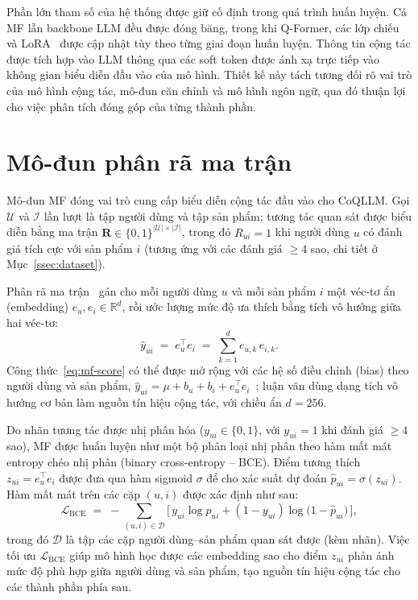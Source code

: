 Phần lớn tham số của hệ thống được giữ cố định trong quá trình huấn luyện. Cả MF lẫn backbone
LLM đều được đóng băng, trong khi Q-Former, các lớp chiếu và LoRA~\cite{lora2021} được cập nhật tùy theo từng giai đoạn huấn luyện.
Thông tin cộng tác được tích hợp vào LLM thông qua các soft token được ánh xạ trực tiếp vào không gian biểu diễn đầu vào của mô hình.
Thiết kế này tách tương đối rõ vai trò của mô hình cộng tác, mô-đun căn chỉnh và mô hình ngôn ngữ, qua đó thuận lợi cho
việc phân tích đóng góp của từng thành phần.

\section{Mô-đun phân rã ma trận}
\label{sec:mf}

Mô-đun MF đóng vai trò cung cấp biểu diễn cộng tác đầu vào cho CoQLLM. Gọi $\mathcal{U}$ và
$\mathcal{I}$ lần lượt là tập người dùng và tập sản phẩm; tương tác quan sát được biểu diễn
bằng ma trận $\mathbf{R} \in \{0,1\}^{|\mathcal{U}| \times |\mathcal{I}|}$, trong đó
$R_{ui}=1$ khi người dùng $u$ có đánh giá tích cực với sản phẩm $i$ (tương ứng với các đánh giá
$\ge 4$ sao, chi tiết ở Mục~\ref{ssec:dataset}).

Phân rã ma trận~\cite{mf2009} gán cho mỗi người dùng $u$ và mỗi sản phẩm $i$ một véc-tơ ẩn
(embedding) $e_u, e_i \in \mathbb{R}^{d}$, rồi ước lượng mức độ ưa thích bằng tích vô hướng
giữa hai véc-tơ:
\begin{equation}\label{eq:mf-score}
\hat{y}_{ui} \;=\; e_u^\top e_i \;=\; \sum_{k=1}^{d} e_{u,k}\, e_{i,k}.
\end{equation}
Công thức~\eqref{eq:mf-score} có thể được mở rộng với các hệ số điều chỉnh (bias) theo người
dùng và sản phẩm, $\hat{y}_{ui} = \mu + b_u + b_i + e_u^\top e_i$~\cite{mf2009}; luận văn dùng
dạng tích vô hướng cơ bản làm nguồn tín hiệu cộng tác, với chiều ẩn $d = 256$.

Do nhãn tương tác được nhị phân hóa ($y_{ui} \in \{0,1\}$, với $y_{ui}=1$ khi đánh giá $\ge 4$
sao), MF được huấn luyện như một bộ phân loại nhị phân theo hàm mất mát entropy chéo nhị phân
(binary cross-entropy -- BCE). Điểm tương thích $z_{ui} = e_u^\top e_i$ được đưa qua hàm
sigmoid $\sigma$ để cho xác suất dự đoán $\hat{p}_{ui} = \sigma(z_{ui})$. Hàm mất mát trên các
cặp $(u,i)$ được xác định như sau:
\begin{equation}\label{eq:bce-mf}
\mathcal{L}_{\text{BCE}} \;=\; -\!\!\sum_{(u,i)\in\mathcal{D}}\!\big[\,
  y_{ui}\log \hat{p}_{ui} + (1-y_{ui})\log\!\big(1-\hat{p}_{ui}\big) \,\big],
\end{equation}
trong đó $\mathcal{D}$ là tập các cặp người dùng--sản phẩm quan sát được (kèm nhãn). Việc tối
ưu $\mathcal{L}_{\text{BCE}}$ giúp mô hình học được các embedding sao cho điểm $z_{ui}$ phản ánh 
mức độ phù hợp giữa người dùng và sản phẩm, tạo nguồn tín hiệu cộng tác cho các thành phần phía sau.

